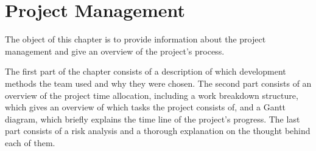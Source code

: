 \chapter{Project Management}

The object of this chapter is to provide information about the project management and give an overview of the project's process. 

The first part of the chapter consists of a description of which development methods the team used and why they were chosen. The second part consists of an overview of the project time allocation, including a work breakdown structure, which gives an overview of which tasks the project consists of, and a Gantt diagram, which briefly explains the time line of the project's progress. The last part consists of a risk analysis and a thorough explanation on the thought behind each of them.




\newpage



